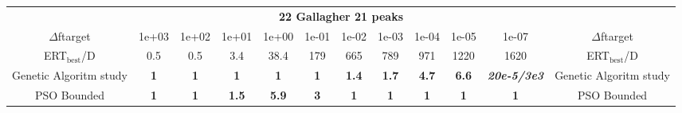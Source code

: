 \begin{tabular}{cccccccccccc}
 & \multicolumn{10}{c}{{\normalsize \textbf{22 Gallagher 21 peaks}}}\\
$\Delta$ftarget& 1e+03& 1e+02& 1e+01& 1e+00& 1e-01& 1e-02& 1e-03& 1e-04& 1e-05& 1e-07 & $\Delta$ftarget \\
ERT$_{\textrm{best}}$/D& 0.5& 0.5& 3.4& 38.4& 179& 665& 789& 971& 1220& 1620 & ERT$_{\textrm{best}}$/D \\
\hline
Genetic Algoritm study & \textbf{1} & \textbf{1} & \textbf{1} & \textbf{1} & \textbf{1} & \textbf{1.4} & \textbf{1.7} & \textbf{4.7} & \textbf{6.6} & \textbf{\textit{20e-5}\textit{/3e3}} & Genetic Algoritm study \cite{add_an_entry_for_Genetic Algoritm study_in_bbob.bib}\\
PSO Bounded & \textbf{1} & \textbf{1} & \textbf{1.5} & \textbf{5.9} & \textbf{3} & \textbf{1} & \textbf{1} & \textbf{1} & \textbf{1} & \textbf{1} & PSO Bounded \cite{add_an_entry_for_PSO Bounded_in_bbob.bib}
\end{tabular}
